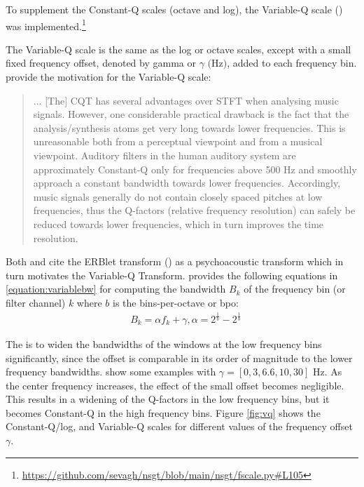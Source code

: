 \documentclass[report.tex]{subfiles}
\begin{document}
To supplement the Constant-Q scales (octave and log), the Variable-Q scale (\cite{variableq1, variableq2}) was implemented.\footnote{\url{https://github.com/sevagh/nsgt/blob/main/nsgt/fscale.py\#L105}}

The Variable-Q scale is the same as the log or octave scales, except with a small fixed frequency offset, denoted by gamma or $\gamma \text{ (Hz)}$, added to each frequency bin. \textcite[5]{variableq1} provide the motivation for the Variable-Q scale:
\begin{quote}
	... [The] CQT has several advantages over STFT when analysing music signals. However, one considerable practical drawback is the fact that the analysis/synthesis atoms get very long towards lower frequencies. This is unreasonable both from a perceptual viewpoint and from a musical viewpoint. Auditory filters in the human auditory system are approximately Constant-Q only for frequencies above 500 Hz and smoothly approach a constant bandwidth towards lower frequencies. Accordingly, music signals generally do not contain closely spaced pitches at low frequencies, thus the Q-factors (relative frequency resolution) can safely be reduced towards lower frequencies, which in turn improves the time resolution.
\end{quote}

Both \textcite{variableq1} and \textcite{variableq2} cite the ERBlet transform (\cite{erblet}) as a psychoacoustic transform which in turn motivates the Variable-Q Transform. \textcite{variableq1, variableq2} provides the following equations in \eqref{equation:variablebw} for computing the bandwidth $B_{k}$ of the frequency bin (or filter channel) $k$ where $b$ is the bins-per-octave or bpo:
\begin{align}\tag{5}\label{equation:variablebw}
	\nonumber & B_{k} = \alpha f_{k} + \gamma, \alpha = 2^{\frac{1}{b}} - 2^{\frac{1}{b}}
\end{align}

The is to widen the bandwidths of the windows at the low frequency bins significantly, since the offset is comparable in its order of magnitude to the lower frequency bandwidths. \textcite{variableq1} show some examples with $\gamma = [0, 3, 6.6, 10, 30] \text{ Hz}$. As the center frequency increases, the effect of the small offset becomes negligible. This results in a widening of the Q-factors in the low frequency bins, but it becomes Constant-Q in the high frequency bins. Figure \ref{fig:vq} shows the Constant-Q/log, and Variable-Q scales for different values of the frequency offset $\gamma$.
\end{document}
